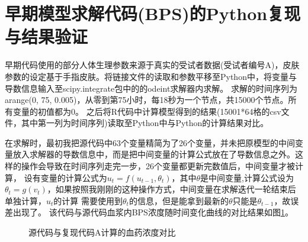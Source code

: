 \documentclass{article}
\begin{document}
\section*{早期模型求解代码(BPS)的Python复现与结果验证}

早期代码使用的部分人体生理参数来源于真实的受试者数据(受试者编号A)，皮肤参数的设定基于手指皮肤。将链接文件的读取和参数平移至Python中，将变量与导数信息输入至scipy.integrate包中的的odeint求解器内求解。
求解的时间序列为arange(0, 75, 0.005)，从零到第75小时，每18秒为一个节点，共15000个节点。所有变量的初值都为0。
之后将R代码中计算模型得到的结果(15001*64格的csv文件，其中第一列为时间序列)读取至Python中与Python的计算结果对比。

在求解时，最初我把源代码中63个变量精简为了26个变量，并未把原模型的中间变量放入求解器的导数信息中，而是把中间变量的计算公式放在了导数信息之外。这样的操作会导致在时间序列走完一步，26个变量都更新完数值后，中间变量才被计算，
设有变量的计算公式为$u_t=f(u_{t-1},\theta_t)$，其中$\theta$是中间变量,计算公式设为$\theta_t=g(v_t)$，如果按照我刚刚的这种操作方式，中间变量在求解迭代一轮结束后单独计算，$u_t$的计算
需要使用到$\theta_t$的信息，但是能拿到最新的$\theta$只能是$\theta_{t-1}$，故误差出现了。
该代码与源代码血浆内BPS浓度随时间变化曲线的对比结果如图\ref{fig:main}。

\begin{figure}
  \centering
  \caption{源代码与复现代码A计算的血药浓度对比}
  \label{fig:main}
\end{figure}
\end{document}
